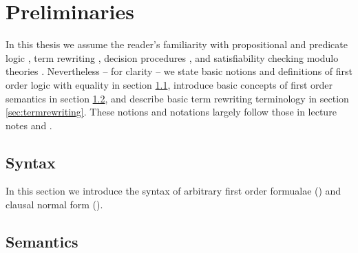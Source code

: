 
\chapter{Preliminaries}

%

In this thesis we assume the reader's familiarity with 
propositional and predicate logic \cite{Huth:2004:LCS:975331}, 
term rewriting \cite{Baader:1998:TR:280474}, 
decision procedures \cite{Kroening:2008:DPA:1391237}, 
and satisfiability checking modulo theories \cite{Biere:2009:HSV:1550723}.
Nevertheless -- for clarity -- we state basic notions and  definitions 
of first order logic with equality in section \ref{sec:syntax},
introduce basic concepts of first order semantics in section \ref{sec:semantics},
and describe basic term rewriting terminology in section \ref{sec:termrewriting}. 
These notions and notations largely follow those in lecture notes \cite{AM2015tr} and \cite{GM2013ar}.


\section{Syntax}\label{sec:syntax}

In this section we introduce the syntax of arbitrary first order formualae (\FOF) 
and clausal normal form (\CNF).



















\section{Semantics}\label{sec:semantics}

